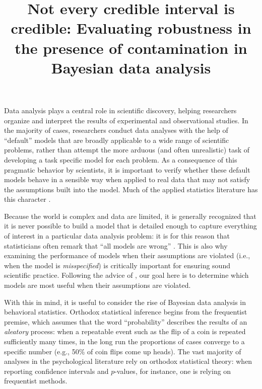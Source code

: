 \documentclass[doc]{apa6}
\title{Not every credible interval is credible: Evaluating robustness in the presence of contamination in Bayesian data analysis}
\begin{document}
\maketitle

Data analysis plays a central role in scientific discovery, helping researchers organize and interpret the results of experimental and observational studies. In the majority of cases, researchers conduct data analyses with the help of ``default'' models that are broadly applicable to a wide range of scientific problems, rather than attempt the more arduous (and often unrealistic) task of developing a task specific model for each problem. As a consequence of this pragmatic behavior by scientists, it is important to verify whether these default models behave in a sensible way when applied to real data that may not satisfy the assumptions built into the model. Much of the applied statistics literature has this character \parencite{bamnett1994outliers,wilcox_introduction_2012,hoaglin2011exploring}.

Because the world is complex and data are limited, it is generally recognized that it is never possible to build a model that is detailed enough to capture everything of interest in a particular data analysis problem: it is for this reason that statisticians often remark that ``all models are wrong'' \parencite[e.g.,][]{box_science_1976}.   This is also why   examining the performance of models when their assumptions are violated (i.e., when the model is {\it misspecified}) is critically important for ensuring sound scientific practice.   Following the advice of \textcite{box_science_1976}, our goal here is to determine which models are most useful when their assumptions are violated.

With this in mind, it is useful to consider the rise of Bayesian data analysis in behavioral statistics. Orthodox statistical inference begins from the frequentist premise, which assumes that the word ``probability'' describes the results of an {\it aleatory} process: when a repeatable event such as the flip of a coin is repeated sufficiently many times, in the long run the proportions of cases converge to a specific number (e.g., 50\% of coin flips come up heads). The vast majority of analyses in the psychological literature rely on orthodox statistical theory: when reporting confidence intervals and $p$-values, for instance, one is relying on frequentist methods.
\end{document}
